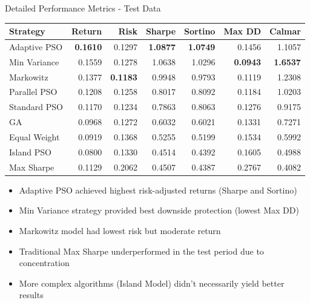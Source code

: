 \documentclass[aspectratio=169,xcolor=table]{beamer}
\begin{document}
\begin{frame}{Detailed Performance Metrics - Test Data}
  \centering
  \small
  \begin{tabular}{lrrrrrr}
    \toprule
    \textbf{Strategy} & \textbf{Return} & \textbf{Risk} & \textbf{Sharpe} & \textbf{Sortino} & \textbf{Max DD} & \textbf{Calmar} \\
    \midrule
    Adaptive PSO & \textbf{0.1610} & 0.1297 & \textbf{1.0877} & \textbf{1.0749} & 0.1456 & 1.1057 \\
    Min Variance & 0.1559 & 0.1278 & 1.0638 & 1.0296 & \textbf{0.0943} & \textbf{1.6537} \\
    Markowitz    & 0.1377 & \textbf{0.1183} & 0.9948 & 0.9793 & 0.1119 & 1.2308 \\
    Parallel PSO & 0.1208 & 0.1258 & 0.8017 & 0.8092 & 0.1184 & 1.0203 \\
    Standard PSO & 0.1170 & 0.1234 & 0.7863 & 0.8063 & 0.1276 & 0.9175 \\
    GA           & 0.0968 & 0.1272 & 0.6032 & 0.6021 & 0.1331 & 0.7271 \\
    Equal Weight & 0.0919 & 0.1368 & 0.5255 & 0.5199 & 0.1534 & 0.5992 \\
    Island PSO   & 0.0800 & 0.1330 & 0.4514 & 0.4392 & 0.1605 & 0.4988 \\
    Max Sharpe   & 0.1129 & 0.2062 & 0.4507 & 0.4387 & 0.2767 & 0.4082 \\
    \bottomrule
  \end{tabular}
  
  \vspace{0.5cm}
  \begin{tcolorbox}[
    enhanced,
    colback=blue!5,
    colframe=blue!70,
    arc=2mm,
    title=Key Insights,
    fonttitle=\bfseries\large,
    boxrule=0.5mm
  ]
    \begin{itemize}
      \item Adaptive PSO achieved highest risk-adjusted returns (Sharpe and Sortino)
      \item Min Variance strategy provided best downside protection (lowest Max DD)
      \item Markowitz model had lowest risk but moderate return
      \item Traditional Max Sharpe underperformed in the test period due to concentration
      \item More complex algorithms (Island Model) didn't necessarily yield better results
    \end{itemize}
  \end{tcolorbox}
\end{frame}
\end{document}
